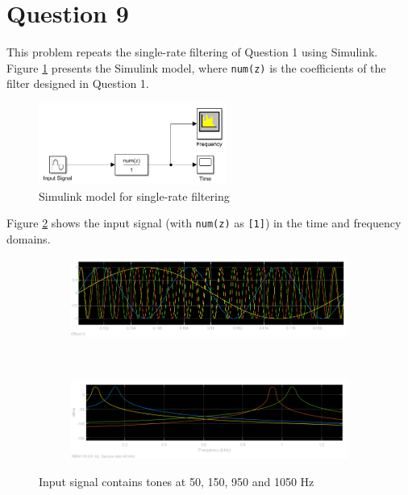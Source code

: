 \section*{Question 9}

This problem repeats the single-rate filtering of Question 1 using Simulink. Figure \ref{fig:q9_simulink} presents the Simulink model, where \texttt{num(z)} is the coefficients of the filter designed in Question 1.

\begin{figure}[ht]
    \centering
    \includegraphics[width=0.55\textwidth]{images/q9_simulink.png}
    \caption{Simulink model for single-rate filtering}
    \label{fig:q9_simulink}
\end{figure}

Figure \ref{fig:q9_inpt} shows the input signal (with \texttt{num(z)} as \texttt{[1]}) in the time and frequency domains.

\begin{figure}[ht]
    \centering
    \begin{subfigure}[b]{0.69\textwidth}
        \centering
        \includegraphics[width=\textwidth]{images/q9_inpt_time.png}
    \end{subfigure}
    \\
    \begin{subfigure}[b]{0.7\textwidth}
        \centering
        \includegraphics[width=\textwidth]{images/q9_inpt_freq.png}
    \end{subfigure}
    \caption{Input signal contains tones at 50, 150, 950 and 1050 Hz}
    \label{fig:q9_inpt}
\end{figure}

